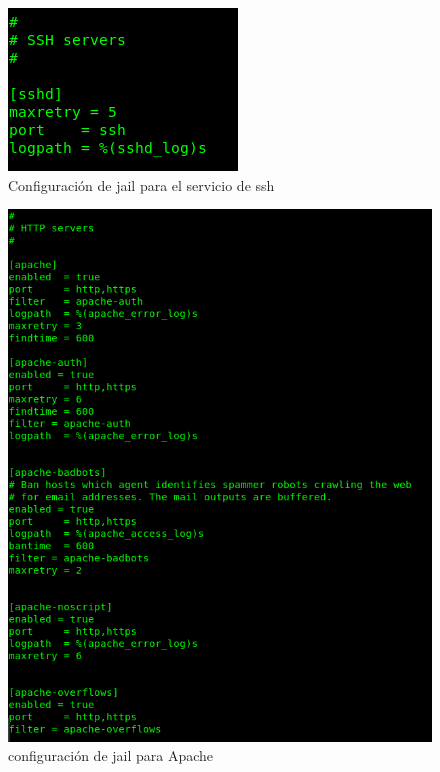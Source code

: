 \documentclass[12pt]{article}
\begin{document}
\begin{figure}[H]
  \centering
  \includegraphics[scale=0.7]{fail2ban/ssh_jail}
  \caption{Configuración de jail para el servicio de ssh}
\end{figure}
\begin{figure}[H]
  \centering
  \includegraphics[scale=0.3]{fail2ban/apache_jails}
  \caption{configuración de jail para Apache}
\end{figure}
\end{document}
